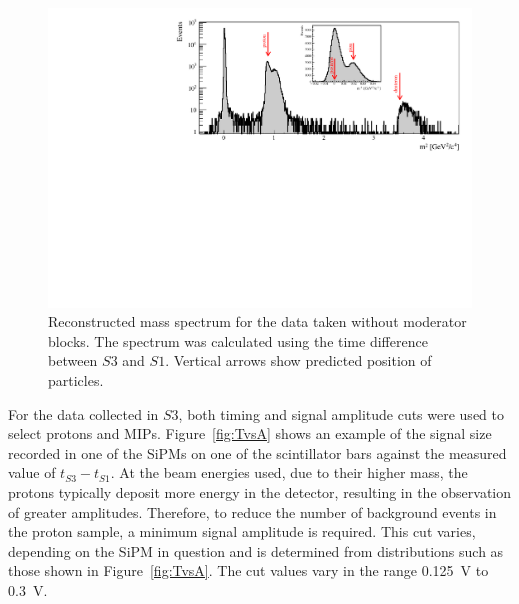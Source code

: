 \begin{figure}[h]
	\centering
	\includegraphics[width=0.9\linewidth]{files/Figures/Data_2018_8_31_b2_800MeV_0block_All.pdf}
	\caption{Reconstructed mass spectrum for the data taken without moderator blocks. The spectrum was calculated using the time difference between $\mathit{S3}$ and $\mathit{S1}$. Vertical arrows show predicted position of particles.}
	\label{fig:s3tof_mass}
\end{figure}

For the data collected in $\mathit{S3}$, both timing and signal amplitude cuts were used to select protons and MIPs.
Figure~\ref{fig:TvsA} shows an example of the signal size recorded in one of the SiPMs on one of the scintillator bars against the measured value of $t_{\mathit{S3}} - t_{\mathit{S1}}$.
At the beam energies used, due to their higher mass, the protons typically deposit more energy in the detector, resulting in the observation of greater amplitudes.
Therefore, to reduce the number of background events in the proton sample, a minimum signal amplitude is required.
This cut varies, depending on the SiPM in question and is determined from distributions such as those shown in Figure~\ref{fig:TvsA}. 
The cut values vary in the range 0.125~V to 0.3~V.

